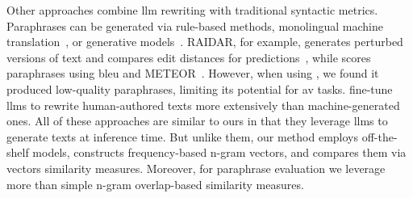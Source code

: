 Other approaches combine \ac{llm} rewriting with traditional syntactic metrics. 
Paraphrases can be generated via rule-based methods, monolingual machine translation~\citep{zhou_paraphrase_2021}, or generative models~\citep{kurt_pehlivanoglu_comparative_2024}. 
RAIDAR, for example, generates perturbed versions of text and compares edit distances for predictions~\citep{mao_raidar_2024}, while \mirrorMinds{} scores paraphrases using \acs{bleu} and METEOR~\citep{baradia_mirror_2025}. 
However, when using \mirrorMinds{}, we found it produced low-quality paraphrases, limiting its potential for \ac{av} tasks. %
\citet{li_learning_2025} fine-tune \acp{llm} to rewrite human-authored texts more extensively than machine-generated ones. 
All of these approaches are similar to ours in that they leverage \acp{llm} to generate texts at inference time. 
But unlike them, our method employs off-the-shelf models, constructs frequency-based n-gram vectors, and compares them via vectors similarity measures.
Moreover, for paraphrase evaluation we leverage more than simple n-gram overlap-based similarity measures.
